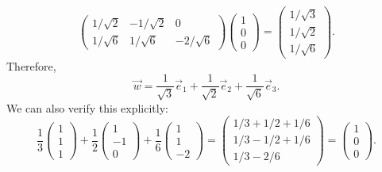 \documentclass[11pt, letterpaper]{article}
\begin{document}
\begin{itemize}
\[\begin{pmatrix}
			1/\sqrt{2}  & -1/\sqrt{2}  & 0  \\
			1/\sqrt{6}  & 1/\sqrt{6}  & -2/\sqrt{6} 
			\end{pmatrix} \begin{pmatrix}
			1 \\
			0 \\
			0
			\end{pmatrix}=\begin{pmatrix}
			1/\sqrt{3}  \\
			1/\sqrt{2}  \\
			1/\sqrt{6} 
			\end{pmatrix}
		.\]
		Therefore,
		\[
			\vec{w} = \frac{1}{\sqrt{3} } \vec{e}_1 + \frac{1}{\sqrt{2} } \vec{e}_2 + \frac{1}{\sqrt{6} } \vec{e}_3
		.\]
		We can also verify this explicitly:
		\[
			\frac{1}{3} \begin{pmatrix}
			1 \\
			1 \\
			1
			\end{pmatrix}+\frac{1}{2} \begin{pmatrix}
			1 \\
			-1 \\
			0
			\end{pmatrix}+\frac{1}{6} \begin{pmatrix}
			1 \\
			1 \\
			-2
			\end{pmatrix}=\begin{pmatrix}
			1/3+1/2+1/6 \\
			1/3-1/2+1/6 \\
			1/3-2/6
			\end{pmatrix}=\begin{pmatrix}
			1 \\
			0 \\
			0
			\end{pmatrix}
		.\]
\end{itemize}
\end{document}
